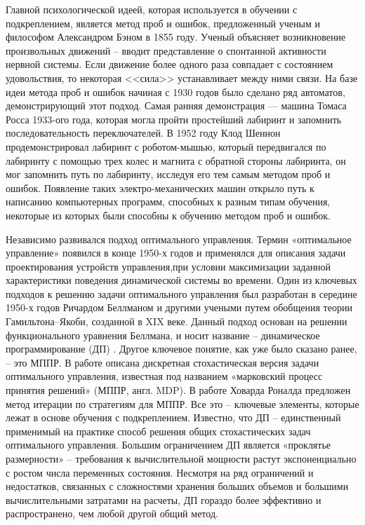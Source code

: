 Главной психологической идеей, которая используется в обучении с подкреплением, является метод проб и ошибок, предложенный ученым и философом Александром Бэном в 1855 году. Ученый объясняет возникновение произвольных движений -- вводит представление о спонтанной активности нервной системы. Если движение более одного раза совпадает с состоянием удовольствия, то некоторая <<сила>> устанавливает между ними связи. На базе идеи метода проб и ошибок начиная с 1930 годов было сделано ряд автоматов, демонстрирующий этот подход. Самая ранняя демонстрация — машина Томаса Росса 1933-ого года, которая могла пройти простейший лабиринт и запомнить последовательность переключателей. В 1952 году Клод Шеннон продемонстрировал лабиринт с роботом-мышью, который передвигался по лабиринту с помощью трех колес и магнита с обратной стороны лабиринта, он мог запомнить путь по лабиринту, исследуя его тем самым методом проб и ошибок. Появление таких электро-механических машин открыло путь к написанию компьютерных программ, способных к разным типам обучения, некоторые из которых были способны к обучению методом проб и ошибок.

Независимо развивался подход оптимального управления. Термин «оптимальное управление» появился в конце 1950-х годов и применялся для описания задачи проектирования устройств управления,при условии максимизации заданной характеристики поведения динамической системы во времени. Один из ключевых подходов к решению задачи оптимального управления был разработан в середине 1950-х годов Ричардом Беллманом и другими учеными путем обобщения теории Гамильтона–Якоби, созданной в XIX веке. Данный подход основан на решении функционального уравнения Беллмана, и носит название -- динамическое программирование (ДП) \cite{bellman1957dp}.  Другое ключевое понятие, как уже было сказано ранее, -- это МППР. В работе \cite{bellman1957markovian} описана дискретная стохастическая версия задачи оптимального управления, известная под названием «марковский процесс принятия решений» (МППР, англ.  MDP).  В работе Ховарда Роналда \cite{howard:dp}  предложен  метод  итерации  по стратегиям  для  МППР.  
Все это –  ключевые элементы, которые лежат в основе обучения с подкреплением. Известно, что ДП –  единственный применимый на практике способ решения общих стохастических задач оптимального управления. Большим ограничением ДП является «проклятье размерности» -- требования к вычислительной мощности растут экспоненциально с ростом числа переменных состояния.  Несмотря на ряд ограничений и недостатков, связанных с сложностями хранения больших объемов и большими вычислительными затратами на расчеты, ДП гораздо более эффективно и распространено, чем любой другой общий метод. 

